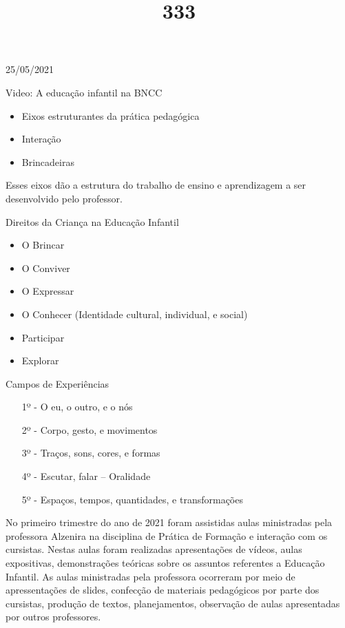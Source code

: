 \documentclass{SchoolBook}
\begin{document}
    \begin{day}{25/05/2021}
        \title{3}{Video: A educação infantil na BNCC}
        
        \begin{itemize}[nosep]
            \item Eixos estruturantes da prática pedagógica
            \item Interação
            \item Brincadeiras
        \end{itemize}
        \vspace{6pt}
        
        Esses eixos dão a estrutura do trabalho de ensino e aprendizagem a ser desenvolvido pelo professor.
        
        \title{3}{Direitos da Criança na Educação Infantil}
        
        \begin{itemize}[nosep]
            \item O Brincar
            \item O Conviver
            \item O Expressar
            \item O Conhecer (Identidade cultural, individual, e social)
            \item Participar
            \item Explorar
        \end{itemize}
        
        \title{3}{Campos de Experiências}
        
        \begin{enumerate}[nosep]
            \item[1º -] O eu, o outro, e o nós
            \item[2º -] Corpo, gesto, e movimentos
            \item[3º -] Traços, sons, cores, e formas
            \item[4º -] Escutar, falar -- Oralidade
            \item[5º -] Espaços, tempos, quantidades, e transformações
        \end{enumerate}
        
        No primeiro trimestre do ano de 2021 foram assistidas aulas ministradas pela professora Alzenira na disciplina de Prática de Formação e interação com os cursistas. Nestas aulas foram realizadas apresentações de vídeos, aulas expositivas, demonstrações teóricas sobre os assuntos referentes a Educação Infantil. As aulas ministradas pela professora ocorreram por meio de apressentações de slides, confecção de materiais pedagógicos por parte dos cursistas, produção de textos, planejamentos, observação de aulas apresentadas por outros professores.
        
        
    \end{day}
\end{document}
